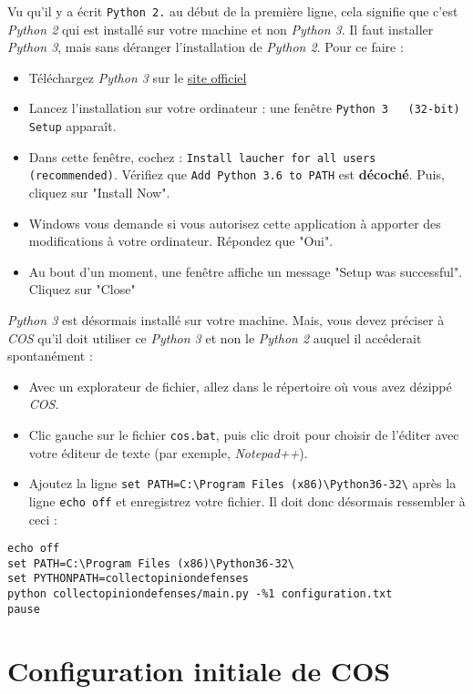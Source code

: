 \documentclass[11pt]{article}
\begin{document}
Vu qu'il y a écrit \verb~Python 2.~ au début de la première ligne, cela
signifie que c'est \emph{Python 2} qui est installé sur votre machine et
non \emph{Python 3}. Il faut installer \emph{Python 3}, mais sans déranger
l'installation de \emph{Python 2}. Pour ce faire :

\begin{itemize}
\item Téléchargez \emph{Python 3} sur le \href{https://www.python.org/downloads/}{site officiel}
\item Lancez l'installation sur votre ordinateur : une fenêtre \verb~Python 3   (32-bit) Setup~ apparaît.
\item Dans cette fenêtre, cochez : \verb~Install laucher for all users   (recommended)~. Vérifiez que \verb~Add Python 3.6 to PATH~ est
\textbf{décoché}. Puis, cliquez sur "Install Now".
\item Windows vous demande si vous autorisez cette application à apporter
des modifications à votre ordinateur. Répondez que "Oui".
\item Au bout d'un moment, une fenêtre affiche un message "Setup was
successful". Cliquez sur "Close"
\end{itemize}

\emph{Python 3} est désormais installé sur votre machine. Mais, vous devez
préciser à \emph{COS} qu'il doit utiliser ce \emph{Python 3} et non le \emph{Python
2} auquel il accéderait spontanément :
\begin{itemize}
\item Avec un explorateur de fichier, allez dans le répertoire où vous
avez dézippé \emph{COS}.
\item Clic gauche sur le fichier \verb~cos.bat~, puis clic droit pour choisir
de l'éditer avec votre éditeur de texte (par exemple, \emph{Notepad++}).
\item Ajoutez la ligne \verb~set PATH=C:\Program Files (x86)\Python36-32\~ 
après la ligne \verb~echo off~ et enregistrez votre fichier. Il doit 
donc désormais ressembler à ceci :
\end{itemize}
\begin{verbatim}
echo off
set PATH=C:\Program Files (x86)\Python36-32\
set PYTHONPATH=collectopiniondefenses
python collectopiniondefenses/main.py -%1 configuration.txt
pause
\end{verbatim}

\section{Configuration initiale de COS}
\label{sec-3}
\end{document}
